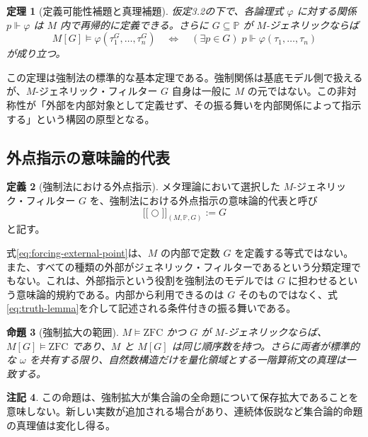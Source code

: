\documentclass[a4paper,11pt]{ltjsarticle}
\theoremstyle{definition}
\newtheorem{definition}{定義}[section]
\newtheorem{remark}[definition]{注記}
\theoremstyle{plain}
\newtheorem{theorem}[definition]{定理}
\newtheorem{proposition}[definition]{命題}
\newcommand{\ZFC}{\mathrm{ZFC}}
\newcommand{\dfix}{\bigcirc}
\newcommand{\sem}[1]{\mathopen{[\![}#1\mathclose{]\!]}}
\begin{document}
\begin{theorem}[定義可能性補題と真理補題]
仮定3.2の下で、各論理式 $\varphi$ に対する関係 $p\Vdash\varphi$ は $M$ 内で再帰的に定義できる。さらに $G\subseteq\mathbb P$ が $M$-ジェネリックならば
\begin{equation}
 M[G]\models\varphi(\tau_1^G,\dots,\tau_n^G)
 \quad\Longleftrightarrow\quad
 (\exists p\in G)\;
 p\Vdash\varphi(\tau_1,\dots,\tau_n)
 \label{eq:truth-lemma}
\end{equation}
が成り立つ。
\end{theorem}

この定理は強制法の標準的な基本定理である\cite{cohen,bell,jech}。強制関係は基底モデル側で扱えるが、$M$-ジェネリック・フィルター $G$ 自身は一般に $M$ の元ではない。この非対称性が「外部を内部対象として定義せず、その振る舞いを内部関係によって指示する」という構図の原型となる。

\subsection{外点指示の意味論的代表}

\begin{definition}[強制法における外点指示]
メタ理論において選択した $M$-ジェネリック・フィルター $G$ を、強制法における外点指示の意味論的代表と呼び
\begin{equation}
 \sem{\dfix}_{(M,\mathbb P,G)}:=G
 \label{eq:forcing-external-point}
\end{equation}
と記す。
\end{definition}

式\eqref{eq:forcing-external-point}は、$M$ の内部で定数 $G$ を定義する等式ではない。また、すべての種類の外部がジェネリック・フィルターであるという分類定理でもない。これは、外部指示という役割を強制法のモデルでは $G$ に担わせるという意味論的規約である。内部から利用できるのは $G$ そのものではなく、式\eqref{eq:truth-lemma}を介して記述される条件付きの振る舞いである。

\begin{proposition}[強制拡大の範囲]
$M\models\ZFC$ かつ $G$ が $M$-ジェネリックならば、$M[G]\models\ZFC$ であり、$M$ と $M[G]$ は同じ順序数を持つ。さらに両者が標準的な $\omega$ を共有する限り、自然数構造だけを量化領域とする一階算術文の真理は一致する。
\end{proposition}

\begin{remark}
この命題は、強制拡大が集合論の全命題について保存拡大であることを意味しない。新しい実数が追加される場合があり、連続体仮説など集合論的命題の真理値は変化し得る。
\end{remark}
\end{document}

